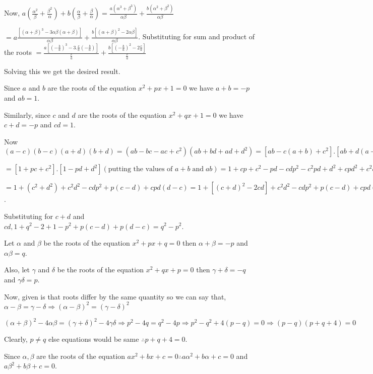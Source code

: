   Now, $a\left(\frac{\alpha^2}{\beta} + \frac{\beta^2}{\alpha}\right) + b\left(\frac{\alpha}{\beta} +
  \frac{\beta}{\alpha}\right) = \frac{a(\alpha^3 + \beta^3)}{\alpha\beta} + \frac{b(\alpha^2 +
    \beta^2)}{\alpha\beta}$

  $= a\frac{[(\alpha + \beta)^3 - 3\alpha\beta(\alpha + \beta)]}{\alpha\beta} + \frac{b[(\alpha + \beta)^2 -
      2\alpha\beta]}{\alpha\beta}$. Substituting for sum and product of the roots $=
  \frac{a\left[\left(-\frac{b}{a}\right)^3 - 3.\frac{c}{a}\left(-\frac{b}{a}\right)\right]}{\frac{c}{a}} +
  \frac{b\left[\left(-\frac{b}{a}\right)^2 -2 \frac{c}{a}\right]}{\frac{c}{a}}$

  Solving this we get the desired result.
\item Since $a$ and $b$ are the roots of the equation $x^2 + px + 1 = 0$ we have $a + b = -p$ and $ab = 1$.

  Similarly, since $c$ and $d$ are the roots of the equation $x^2 + qx + 1 = 0$ we have $c + d = -p$ and
  $cd = 1$.

  Now $(a - c)(b - c)(a + d)(b + d) = (ab - bc - ac + c^2)(ab + bd + ad + d^2) = [ab - c(a + b) + c^2].[ab +
    d(a + b) + d^2]$

  $= [1 + pc + c^2].[1 - pd + d^2] (\text{putting the values of } a + b\;\text{and}\;ab) = 1 + cp + c^2 - pd -
  cdp^2 - c^2pd + d^2 + cpd^2 + c^2d^2$

  $= 1 + (c^2 + d^2) + c^2d^2 -cdp^2 + p(c - d) + cpd(d - c) = 1 + [(c + d)^2 - 2cd] + c^2d^2 - cdp^2 + p(c
  - d) + cpd(d - c)$.

  Substituting for $c + d$ and $cd, 1 + q^2 - 2 + 1 - p^2 + p(c - d) + p(d - c) = q^2 - p^2$.
\item Let $\alpha$ and $\beta$ be the roots of the equation $x^2 + px + q = 0$ then $\alpha + \beta = -p$ and
  $\alpha\beta = q$.

  Also, let $\gamma$ and $\delta$ be the roots of the equation $x^2 + qx + p = 0$ then $\gamma + \delta =
  -q$ and $\gamma\delta = p$.

  Now, given is that roots differ by the same quantity so we can say that, $\alpha - \beta = \gamma -
  \delta\Rightarrow (\alpha - \beta)^2 = (\gamma - \delta)^2$

  $(\alpha + \beta)^2 - 4\alpha\beta = (\gamma + \delta)^2 - 4\gamma\delta\Rightarrow p^2 - 4q = q^2 - 4p
  \Rightarrow p^2 - q^2 + 4(p - q) = 0 \Rightarrow (p - q)(p + q + 4) = 0$

  Clearly, $p \neq q$ else equations would be same $\therefore p + q + 4 = 0$.
\item Since $\alpha, \beta$ are the roots of the equation $ax^2 + bx + c = 0\therefore a\alpha^2 + b\alpha +
  c = 0$ and $a\beta^2 + b\beta + c = 0$.

